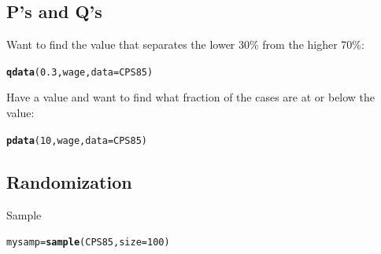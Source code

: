\documentclass{report}\usepackage{graphicx, color}
\makeatletter
\newcommand{\hlfunctioncall}[1]{\textcolor[rgb]{0.501960784313725,0,0.329411764705882}{\textbf{#1}}}%
\newenvironment{kframe}{%
 \def\at@end@of@kframe{}%
 \ifinner\ifhmode%
  \def\at@end@of@kframe{\end{minipage}}%
  \begin{minipage}{\columnwidth}%
 \fi\fi%
 \def\FrameCommand##1{\hskip\@totalleftmargin \hskip-\fboxsep
 \colorbox{shadecolor}{##1}\hskip-\fboxsep
     \hskip-\linewidth \hskip-\@totalleftmargin \hskip\columnwidth}%
 \MakeFramed {\advance\hsize-\width
   \@totalleftmargin\z@ \linewidth\hsize
   \@setminipage}}%
 {\par\unskip\endMakeFramed%
 \at@end@of@kframe}
\newenvironment{knitrout}{}{} %
\makeatother
\begin{document}
\begin{multicols}{4}
\vfill
\columnbreak

\subsection*{P's and Q's}
Want to find the value that separates the lower 30\% from the higher 70\%:

\vspace*{-.1in}

\begin{knitrout}
\color{fgcolor}\begin{kframe}
\begin{alltt}
\hlfunctioncall{qdata}(0.3, wage, data = CPS85)
\end{alltt}
\end{kframe}
\end{knitrout}

Have a value and want to find what fraction of the cases are at or below the value:

\vspace*{-.1in}

\begin{knitrout}
\color{fgcolor}\begin{kframe}
\begin{alltt}
\hlfunctioncall{pdata}(10, wage, data = CPS85)
\end{alltt}
\end{kframe}
\end{knitrout}


\vspace*{-.2in}

\subsection*{Randomization}
Sample

\vspace*{-.1in}
\begin{knitrout}
\color{fgcolor}\begin{kframe}
\begin{alltt}
mysamp = \hlfunctioncall{sample}(CPS85, size = 100)
\end{alltt}
\end{kframe}
\end{knitrout}


\vspace*{-.1in}


\end{multicols}
\end{document}
